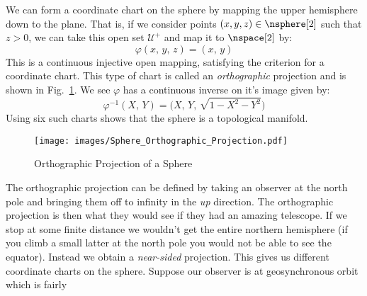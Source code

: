 \documentclass{book}                                                            %
\begin{document}
                \begin{example}
                    We can form a coordinate chart on the sphere by mapping the
                    upper hemisphere down to the plane. That is, if we consider
                    points $(x,y,z)\in\nsphere[2]$ such that $z>0$, we can take
                    this open set $\mathcal{U}^{+}$ and map it to $\nspace[2]$
                    by:
                    \begin{equation}
                        \varphi(x,\,y,\,z)=(x,\,y)
                    \end{equation}
                    This is a continuous injective open mapping, satisfying the
                    criterion for a coordinate chart. This type of chart is
                    called an \textit{orthographic} projection and is shown in
                    Fig.~\ref{fig:Sphere_Orthographic_Projection}. We see
                    $\varphi$ has a continuous inverse on it's image given by:
                    \begin{equation}
                        \varphi^{\minus{1}}(X,\,Y)=
                            \big(X,\,Y,\,\sqrt{1-X^{2}-Y^{2}}\big)
                    \end{equation}
                    Using six such charts shows that the sphere is a topological
                    manifold.
                \end{example}
                \begin{figure}[H]
                    \centering
                    \captionsetup{type=figure}
                    \texttt{[image: images/Sphere\_Orthographic\_Projection.pdf]}
                    \caption{Orthographic Projection of a Sphere}
                    \label{fig:Sphere_Orthographic_Projection}
                \end{figure}
                The orthographic projection can be defined by taking an observer
                at the north pole and bringing them off to infinity in the
                \textit{up} direction. The orthographic projection is then what
                they would see if they had an amazing telescope. If we stop at
                some finite distance we wouldn't get the entire northern
                hemisphere (if you climb a small latter at the north pole you
                would not be able to see the equator). Instead we obtain a
                \textit{near-sided} projection. This gives us different
                coordinate charts on the sphere.
                Suppose our observer is at geosynchronous orbit which is fairly
\end{document}

